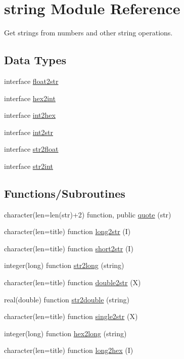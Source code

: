 \hypertarget{namespacestring}{}\section{string Module Reference}
\label{namespacestring}


Get strings from numbers and other string operations.  


\subsection*{Data Types}
\begin{DoxyCompactItemize}
\item 
interface \hyperlink{interfacestring_1_1float2str}{float2str}
\item 
interface \hyperlink{interfacestring_1_1hex2int}{hex2int}
\item 
interface \hyperlink{interfacestring_1_1int2hex}{int2hex}
\item 
interface \hyperlink{interfacestring_1_1int2str}{int2str}
\item 
interface \hyperlink{interfacestring_1_1str2float}{str2float}
\item 
interface \hyperlink{interfacestring_1_1str2int}{str2int}
\end{DoxyCompactItemize}
\subsection*{Functions/\+Subroutines}
\begin{DoxyCompactItemize}
\item 
character(len=len(str)+2) function, public \hyperlink{namespacestring_a43ac41bc9fa839e5e40ec725c029b5a4}{quote} (str)
\item 
character(len=title) function \hyperlink{namespacestring_a734300e2e50f76efa2730b5f1cc7cc21}{long2str} (I)
\item 
character(len=title) function \hyperlink{namespacestring_ac3e429fd86c78765b2408096ae132f8a}{short2str} (I)
\item 
integer(long) function \hyperlink{namespacestring_aefd9037a03dddf650cb9d0a18ed7de95}{str2long} (string)
\item 
character(len=title) function \hyperlink{namespacestring_a229fed3adef608ec305da7cbc54b24a8}{double2str} (X)
\item 
real(double) function \hyperlink{namespacestring_a73d6072e501eb7ed3d5aa9e4a5a47f6d}{str2double} (string)
\item 
character(len=title) function \hyperlink{namespacestring_a78ede8e0d165537ea978aeeb8227bc3f}{single2str} (X)
\item 
integer(long) function \hyperlink{namespacestring_a133490e9f060a404b52108895b255435}{hex2long} (string)
\item 
character(len=title) function \hyperlink{namespacestring_a58fb75f0ded0856267e7770d4b13b2f6}{long2hex} (I)
\end{DoxyCompactItemize}


